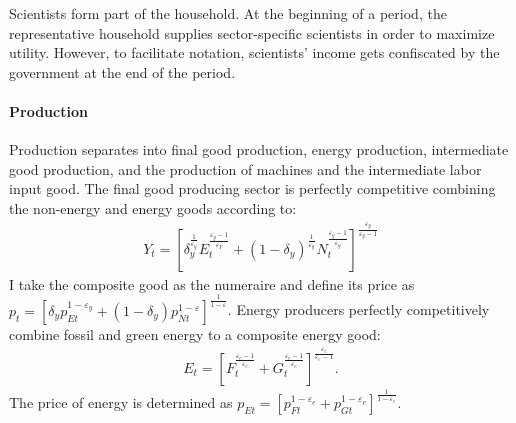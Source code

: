 Scientists form part of the household. At the beginning of a period,  the representative household supplies sector-specific scientists in order to maximize utility. However, to facilitate notation, scientists' income gets confiscated by the government at the end of the period. %


\paragraph{Production}
Production separates into final good production, energy production, intermediate good production, and the production of machines and the intermediate labor input good. 
The final good producing sector is perfectly competitive combining the non-energy and energy goods according to:
\begin{align}
Y_t=\left[\delta_y^\frac{1}{\varepsilon_y}E_{t}^{\frac{\varepsilon_y-1}{\varepsilon_Y}}+(1-\delta_y)^\frac{1}{\varepsilon_y}N_{t}^{\frac{\varepsilon_y-1}{\varepsilon_y}}\right]^\frac{\varepsilon_y}{\varepsilon_y-1}
\end{align} 
I take the composite good as the numeraire and define its price as $p_t=\left[\delta_yp_{Et}^{1-\varepsilon_y}+(1-\delta_y)p_{Nt}^{1-\varepsilon}\right]^{\frac{1}{1-\varepsilon}}$.
Energy producers perfectly competitively combine fossil and green energy to a composite energy good:
\begin{align}
E_t=\left[F_t^\frac{\varepsilon_e-1}{\varepsilon_e}+G_t^\frac{\varepsilon_e-1}{\varepsilon_e}\right]^\frac{\varepsilon_e}{\varepsilon_e-1}.
\end{align}
The price of energy is determined as  $p_{Et}= \left[p_{Ft}^{1-\varepsilon_e}+p_{Gt}^{1-\varepsilon_e}\right]^\frac{1}{{1-\varepsilon_e}}$.

